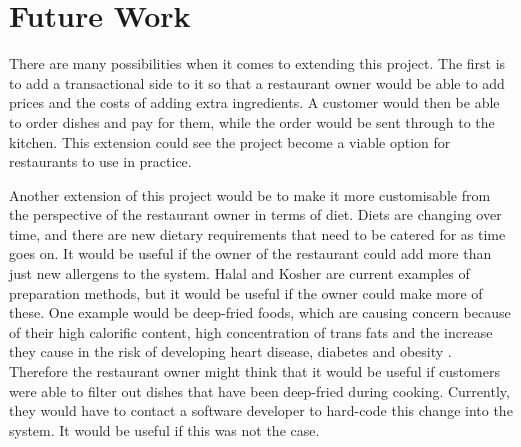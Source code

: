 \section{Future Work}
\label{section:FutureWork}

There are many possibilities when it comes to extending this project. The first is to add a transactional side to it so that a restaurant owner would be able to add prices and the costs of adding extra ingredients. A customer would then be able to order dishes and pay for them, while the order would be sent through to the kitchen. This extension could see the project become a viable option for restaurants to use in practice. 

Another extension of this project would be to make it more customisable from the perspective of the restaurant owner in terms of diet. Diets are changing over time, and there are new dietary requirements that need to be catered for as time goes on. It would be useful if the owner of the restaurant could add more than just new allergens to the system. Halal and Kosher are current examples of preparation methods, but it would be useful if the owner could make more of these. One example would be deep-fried foods, which are causing concern because of their high calorific content, high concentration of trans fats and the increase they cause in the risk of developing heart disease, diabetes and obesity \cite{deep_fried_mcdonnell_2023}. Therefore the restaurant owner might think that it would be useful if customers were able to filter out dishes that have been deep-fried during cooking. Currently, they would have to contact a software developer to hard-code this change into the system. It would be useful if this was not the case.


